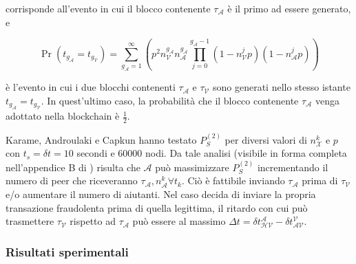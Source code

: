 corrisponde all'evento in cui il blocco contenente $\tau_\mathcal{A}$ è il primo ad essere generato, e

\[ \Pr \left( t_{g_\mathcal{A}} = t_{g_\mathcal{V}} \right) = \sum^{\infty}_{g_\mathcal{A}=1} \left( p^2 n^{g_\mathcal{A}}_\mathcal{V} n^{g_\mathcal{A}}_\mathcal{A} \prod^{g_\mathcal{A} - 1}_{j=0} \left( 1 - n^j_\mathcal{V} p \right)\left( 1 - n^j_\mathcal{A} p \right) \right) \]

è l'evento in cui i due blocchi contenenti $\tau_\mathcal{A}$ e $\tau_\mathcal{V}$ sono generati nello stesso istante $t_{g_\mathcal{A}} = t_{g_\mathcal{V}}$. In quest'ultimo caso, la probabilità che il blocco contenente $\tau_\mathcal{A}$ venga adottato nella blockchain è $\frac{1}{2}$.

Karame, Androulaki e Capkun hanno testato $P^{\left(2\right)}_S$ per diversi valori di $n^k_\mathcal{X}$ e $p$ con $t_s = \delta t = 10$ secondi e 60000 nodi. Da tale analisi (visibile in forma completa nell'appendice B di \cite{doublespendig_fast}) risulta che $\mathcal{A}$ può massimizzare $P^{\left(2\right)}_S$ incrementando il numero di peer che riceveranno $\tau_\mathcal{A}, n^k_\mathcal{A} \forall t_k$. Ciò è fattibile inviando $\tau_\mathcal{A}$ prima di $\tau_\mathcal{V}$ e/o aumentare il numero di aiutanti. Nel caso decida di inviare la propria transazione fraudolenta prima di quella legittima, il ritardo con cui può trasmettere $\tau_\mathcal{V}$ rispetto ad $\tau_\mathcal{A}$ può essere al massimo $\Delta t = \delta t^\mathcal{A}_\mathcal{HV} - \delta t^\mathcal{V}_\mathcal{AV}$.

\subsubsection{Risultati sperimentali}

